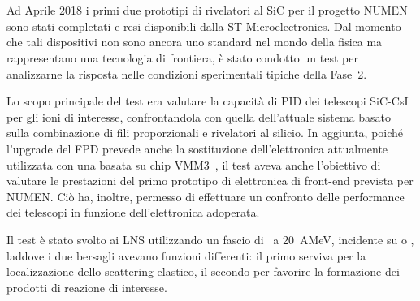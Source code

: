 \section{}

Ad Aprile 2018 i primi due prototipi di rivelatori al SiC per il progetto NUMEN sono stati completati e resi disponibili dalla ST-Microelectronics. Dal momento che tali dispositivi non sono ancora uno standard nel mondo della fisica ma rappresentano una tecnologia di frontiera, è stato condotto un test per analizzarne la risposta nelle condizioni sperimentali tipiche della Fase~2.

Lo scopo principale del test era valutare la capacità di PID dei telescopi SiC-CsI per gli ioni di interesse, confrontandola con quella dell'attuale sistema basato sulla combinazione di fili proporzionali e rivelatori al silicio.
In aggiunta, poiché l'upgrade del FPD prevede anche la sostituzione dell'elettronica attualmente utilizzata con una basata su chip VMM3~\cite{degeronimo:ieee13}, il test aveva anche l'obiettivo di valutare le prestazioni del primo prototipo di elettronica di front-end prevista per NUMEN.
Ciò ha, inoltre, permesso di effettuare un confronto delle performance dei telescopi in funzione dell'elettronica adoperata.

Il test è stato svolto ai LNS utilizzando un fascio di~ a 20~AMeV, incidente su  o , laddove i due bersagli avevano funzioni differenti: il primo serviva per la localizzazione dello scattering elastico, il secondo per favorire la formazione dei prodotti di reazione di interesse.




